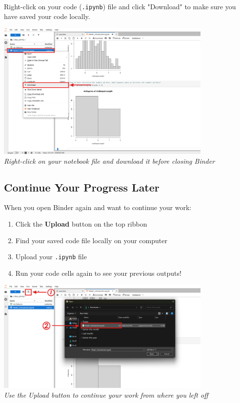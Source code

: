 \documentclass[11pt,a4paper]{article}
\begin{document}
Right-click on your code (\texttt{.ipynb}) file and click "Download" to make sure you have saved your code locally.

\begin{center}
\includegraphics[width=0.8\textwidth]{../Image_11.png}\\
\textit{Right-click on your notebook file and download it before closing Binder}
\end{center}

\subsection{Continue Your Progress Later}

When you open Binder again and want to continue your work:

\begin{enumerate}
    \item Click the \textbf{Upload} button on the top ribbon
    \item Find your saved code file locally on your computer
    \item Upload your \texttt{.ipynb} file
    \item Run your code cells again to see your previous outputs!
\end{enumerate}

\begin{center}
\includegraphics[width=0.8\textwidth]{../Image_12.png}\\
\textit{Use the Upload button to continue your work from where you left off}
\end{center}
\end{document}
